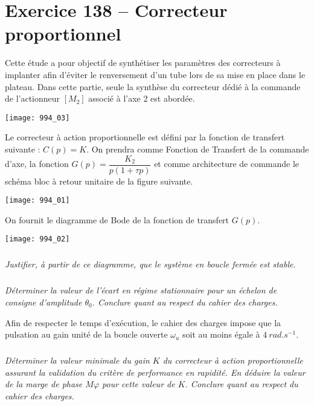 \section*{Exercice 138 -- Correcteur proportionnel}
\setcounter{exo}{0}

\begin{obj}
Cette étude a pour objectif de synthétiser les paramètres des correcteurs à implanter afin d’éviter le
renversement d’un tube lors de sa mise en place dans le plateau. Dans cette partie, seule la synthèse du
correcteur dédié à la commande de l’actionneur $\left[M_2\right]$ associé à l’axe 2 est abordée.
\end{obj}

\begin{center}
\texttt{[image: 994\_03]}
\end{center}


Le correcteur à action proportionnelle est défini par la fonction de transfert suivante : $C(p) = K$.
On prendra comme Fonction de Transfert de la commande d’axe, la fonction $G(p) = \dfrac{K_2}{p\left(1+\tau p\right)}$ et comme architecture de commande le schéma bloc à retour unitaire de la figure suivante.

\begin{center}
\texttt{[image: 994\_01]}
\end{center}

On fournit le diagramme de Bode de la fonction de transfert $G(p)$.


\begin{center}
\texttt{[image: 994\_02]}
\end{center}


\subparagraph{}
\textit{Justifier, à partir de ce diagramme, que le système en boucle fermée est stable.}
\ifprof
\begin{corrige}
\end{corrige}
\else
\fi


\subparagraph{}
\textit{Déterminer la valeur de l’écart en régime stationnaire pour un échelon de consigne d’amplitude $\theta_0$.
Conclure quant au respect du cahier des charges.}
\ifprof
\begin{corrige}
\end{corrige}
\else
\fi

Afin de respecter le temps d’exécution, le cahier des charges impose que la pulsation au gain unité de la boucle
ouverte $\omega_u$ soit au moins égale à $\SI{4}{rad.s^{-1}}$.

\subparagraph{}
\textit{Déterminer la valeur minimale du gain $K$ du correcteur à action proportionnelle assurant la validation
du critère de performance en rapidité. En déduire la valeur de la marge de phase $M\varphi$ pour cette valeur de $K$.
Conclure quant au respect du cahier des charges.}
\ifprof
\begin{corrige}
\end{corrige}
\else
\fi

